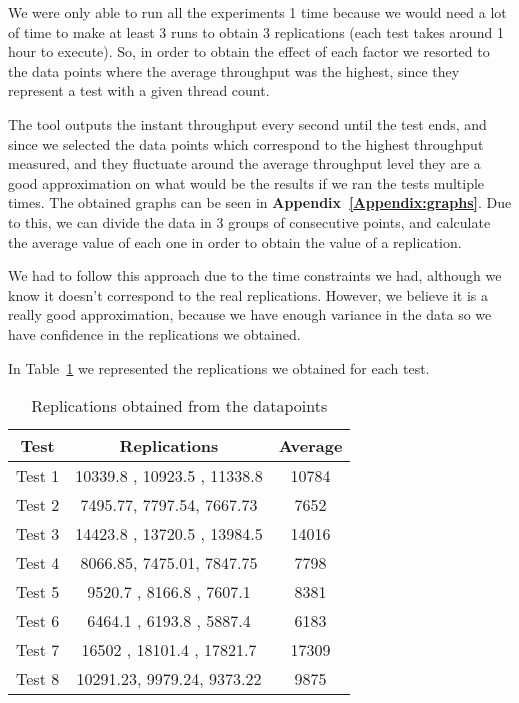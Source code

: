 \documentclass[runningheads]{llncs}
\begin{document}
We were only able to run all the experiments 1 time because we would need a lot of time to make at least 3 runs to obtain 3 replications (each test takes around 1 hour to execute). So, in order to obtain the effect of each factor we resorted to the data points where the average throughput was the highest, since they represent a test with a given thread count.

The tool outputs the instant throughput every second until the test ends, and since we selected the data points which correspond to the highest throughput measured, and they fluctuate around the average throughput level they are a good approximation on what would be the results if we ran the tests multiple times. The obtained graphs can be seen in \textbf{Appendix~\ref{Appendix:graphs}}. Due to this, we can divide the data in 3 groups of consecutive points, and calculate the average value of each one in order to obtain the value of a replication.

We had to follow this approach due to the time constraints we had, although we know it doesn't correspond to the real replications. However, we believe it is a really good approximation, because we have enough variance in the data so we have confidence in the replications we obtained.

In Table~\ref{Tab:replications} we represented the replications we obtained for each test.

\begin{table}[H]
  \caption{Replications obtained from the datapoints}
  \centering
  \begin{tabular}{|c|c|c|}
    \hline
    Test & Replications & Average \\
    \hline
    Test 1 & 10339.8 , 10923.5 , 11338.8  & 10784 \\
    \hline
    Test 2 &  7495.77,  7797.54,  7667.73 &  7652 \\
    \hline
    Test 3 & 14423.8 , 13720.5 , 13984.5  & 14016 \\
    \hline
    Test 4 &  8066.85,  7475.01,  7847.75 &  7798 \\
    \hline
    Test 5 &  9520.7 ,  8166.8 ,  7607.1  &  8381 \\ 
    \hline
    Test 6 &  6464.1 ,  6193.8 ,  5887.4  &  6183 \\
    \hline
    Test 7 & 16502   , 18101.4 , 17821.7  & 17309 \\
    \hline
    Test 8 & 10291.23,  9979.24,  9373.22 &  9875 \\
    \hline
  \end{tabular}
  \label{Tab:replications}
\end{table}
\end{document}
